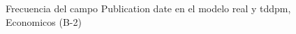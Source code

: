 \begin{figure}[H]
    \centering
    
    \caption{Frecuencia del campo Publication date en el modelo real y tddpm, Economicos (B-2)}
    \label{frecuency-Publication Date-tddpm_mlp}
\end{figure}